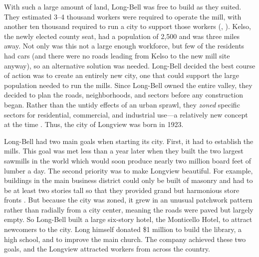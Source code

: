 With such a large amount of land, Long-Bell was free to build as they suited. They estimated 3–4 thousand workers were required to operate the mill, with another ten thousand required to run a city to support those workers (\citealt[5]{wilma_2017}, \citealt[21]{mcclelland_1976}). Kelso, the newly elected county seat, had a population of 2,500 and was three miles away. Not only was this not a large enough workforce, but few of the residents had cars (and there were no roads leading from Kelso to the new mill site anyway), so an alternative solution was needed. Long-Bell decided the best course of action was to create an entirely new city, one that could support the large population needed to run the mills. Since Long-Bell owned the entire valley, they decided to plan the roads, neighborhoods, and sectors before any construction began. Rather than the untidy effects of an urban sprawl, they \textit{zoned} specific sectors for residential, commercial, and industrial use---a relatively new concept at the time \citep[22]{mcclelland_1976}. Thus, the city of Longview was born in 1923.

Long-Bell had two main goals when starting its city. First, it had to establish the mills. This goal was met less than a year later when they built the two largest sawmills in the world which would soon produce nearly two million board feet of lumber a day. The second priority was to make Longview beautiful. For example, buildings in the main business district could only be built of masonry and had to be at least two stories tall so that they provided grand but harmonious store fronts \citep[27]{mcclelland_1976}. But because the city was zoned, it grew in an unusual patchwork pattern rather than radially from a city center, meaning the roads were paved but largely empty. So Long-Bell built a large six-story hotel, the Monticello Hotel, to attract newcomers to the city. Long himself donated \$1 million to build the library, a high school, and to improve the main church. The company achieved these two goals, and the Longview attracted workers from across the country.

